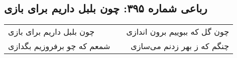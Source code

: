 \begin{center}
\section*{رباعی شماره ۳۹۵: چون بلبل داریم برای بازی}
\label{sec:sh395}
\begin{longtable}{l p{0.5cm} r}
چون بلبل داریم برای بازی
&&
چون گل که ببوییم برون اندازی
\\
شمعم که چو برفروزیم بگدازی
&&
چنگم که ز بهر زدنم می‌سازی
\\
\end{longtable}
\end{center}
